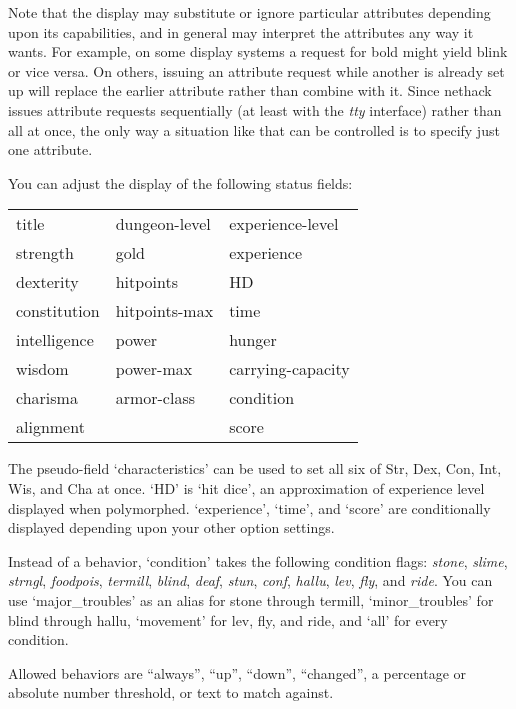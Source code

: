 Note that the display may substitute or ignore particular attributes
depending upon its capabilities, and in general may interpret the
attributes any way it wants.
For example, on some display systems a request for bold might yield
blink or vice versa.
On others, issuing an attribute request while another is already
set up will replace the earlier attribute rather than combine with it.
Since nethack issues attribute requests sequentially (at least with
the {\it tty} interface) rather than all at once, the only way a
situation like that can be controlled is to specify just one attribute.

You can adjust the display of the following status fields:
\begin{center}
\begin{tabular}{lll}
title & dungeon-level & experience-level\\
strength & gold & experience\\
dexterity & hitpoints & HD\\
constitution & hitpoints-max & time\\
intelligence & power & hunger\\
wisdom & power-max & carrying-capacity\\
charisma & armor-class & condition\\
alignment &  & score\\
\end{tabular}
\end{center}
The pseudo-field `characteristics' can be used to set all six
of Str, Dex, Con, Int, Wis, and Cha at once.  `HD' is `hit dice',
an approximation of experience level displayed when polymorphed.
`experience', `time', and `score' are conditionally displayed
depending upon your other option settings.

Instead of a behavior, `condition' takes the following condition flags:
{\it stone}, {\it slime}, {\it strngl}, {\it foodpois}, {\it termill},
{\it blind}, {\it deaf}, {\it stun}, {\it conf}, {\it hallu},
{\it lev}, {\it fly}, and {\it ride}.
You can use `major\_troubles' as an alias
for stone through termill, `minor\_troubles' for blind through hallu,
`movement' for lev, fly, and ride, and `all' for every condition.

Allowed behaviors are ``always'', ``up'', ``down'', ``changed'', a
percentage or absolute number threshold, or text to match against.

